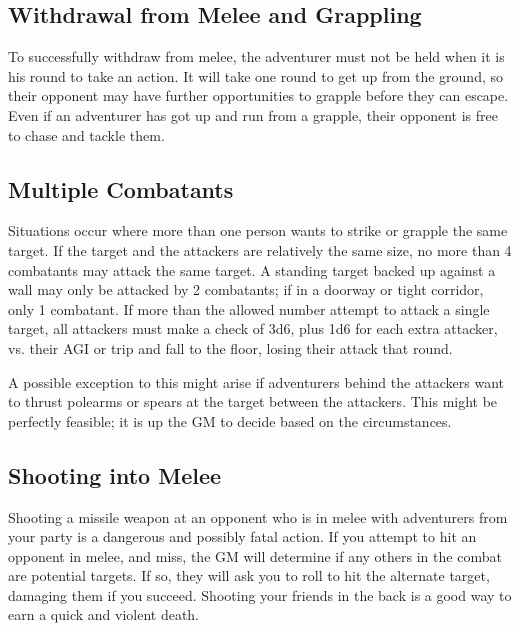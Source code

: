 \subsection{Withdrawal from Melee and Grappling}
To successfully withdraw from melee, the adventurer must not be held when it is his round to take an action. It will take one round to get up from the ground, so their opponent may have further opportunities to grapple before they can escape. Even if an adventurer has got up and run from a grapple, their opponent is free to chase and tackle them.
\subsection{Multiple Combatants}
Situations occur where more than one person wants to strike or grapple the same target. If the target and the attackers are relatively the same size, no more than 4 combatants may attack the same target. A standing target backed up against a wall may only be attacked by 2 combatants; if in a doorway or tight corridor, only 1 combatant. If more than the allowed number attempt to attack a single target, all attackers must make a check of 3d6, plus 1d6 for each extra attacker, vs. their AGI or trip and fall to the floor, losing their attack that round.

A possible exception to this might arise if adventurers behind the attackers want to thrust polearms or spears at the target between the attackers. This might be perfectly feasible; it is up the GM to decide based on the circumstances.
\subsection{Shooting into Melee}
Shooting a missile weapon at an opponent who is in melee with adventurers from your party is a dangerous and possibly fatal action. If you attempt to hit an opponent in
melee, and miss, the GM will determine if any others in the combat are potential targets. If so, they will ask you to roll to hit the alternate target, damaging them if you succeed. Shooting your friends in the back is a good way to earn a quick and violent death.
